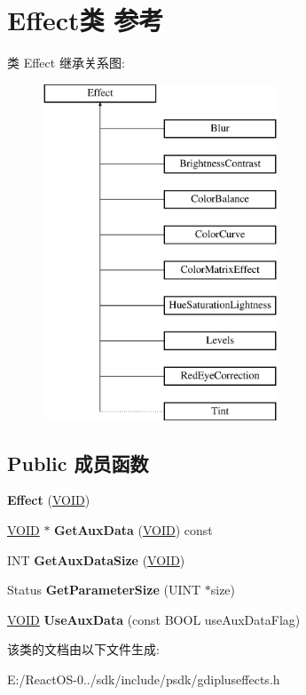 \hypertarget{class_effect}{}\section{Effect类 参考}
\label{class_effect}
类 Effect 继承关系图\+:\begin{figure}[H]
\begin{center}
\leavevmode
\includegraphics[height=10.000000cm]{class_effect}
\end{center}
\end{figure}
\subsection*{Public 成员函数}
\begin{DoxyCompactItemize}
\item 
\mbox{\label{class_effect_a0352e2ca279474b2562591966bb14d10}} 
{\bfseries Effect} (\hyperlink{interfacevoid}{V\+O\+ID})
\item 
\mbox{\label{class_effect_afc8bdac987b7e16af0b4c416636c84b2}} 
\hyperlink{interfacevoid}{V\+O\+ID} $\ast$ {\bfseries Get\+Aux\+Data} (\hyperlink{interfacevoid}{V\+O\+ID}) const
\item 
\mbox{\label{class_effect_a53122fe6ddd7c0136414c14e47a547cf}} 
I\+NT {\bfseries Get\+Aux\+Data\+Size} (\hyperlink{interfacevoid}{V\+O\+ID})
\item 
\mbox{\label{class_effect_ad48b1fc6b399453a791170d49e5d323d}} 
Status {\bfseries Get\+Parameter\+Size} (U\+I\+NT $\ast$size)
\item 
\mbox{\label{class_effect_a0dac887494caebfc1dc0c2c3d10cdc2e}} 
\hyperlink{interfacevoid}{V\+O\+ID} {\bfseries Use\+Aux\+Data} (const B\+O\+OL use\+Aux\+Data\+Flag)
\end{DoxyCompactItemize}


该类的文档由以下文件生成\+:\begin{DoxyCompactItemize}
\item 
E\+:/\+React\+O\+S-\/0../sdk/include/psdk/gdipluseffects.\+h\end{DoxyCompactItemize}
